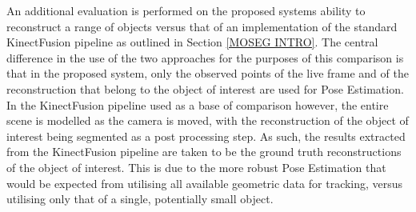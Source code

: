 An additional evaluation is performed on the proposed systems ability to reconstruct 
a range of objects versus that of an implementation of the standard KinectFusion 
pipeline as outlined in Section \ref{MOSEG INTRO}. The central difference in the use 
of the two approaches for the purposes of this comparison is that in the proposed system, 
only the observed points of the live frame and of the reconstruction that belong to the 
object of interest are used for Pose Estimation. In the KinectFusion pipeline used 
as a base of comparison however, the entire scene is modelled as the camera is moved, 
with the reconstruction of the object of interest being segmented as a post processing 
step. As such, the results extracted from the KinectFusion pipeline are taken to be the 
ground truth reconstructions of the object of interest. This is due to the more robust 
Pose Estimation that would be expected from utilising all available geometric data 
for tracking, versus utilising only that of a single, potentially small object.

